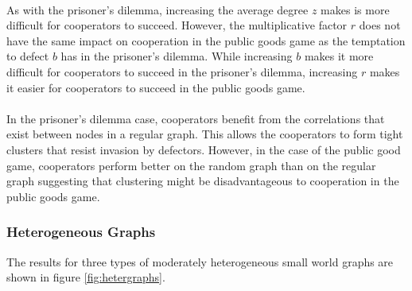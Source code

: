 \documentclass{article}
\begin{document}
	\paragraph{}As with the prisoner's dilemma, increasing the average degree $z$ makes is more difficult for cooperators to succeed.  However, the multiplicative factor $r$ does not have the same impact on cooperation in the public goods game as the temptation to defect $b$ has in the prisoner's dilemma.  While increasing $b$ makes it more difficult for cooperators to succeed in the prisoner's dilemma, increasing $r$ makes it easier for cooperators to succeed in the public goods game.
	\paragraph{}In the prisoner's dilemma case, cooperators benefit from the correlations that exist between nodes in a regular graph.  This allows the cooperators to form tight clusters that resist invasion by defectors.  However, in the case of the public good game, cooperators perform better on the random graph than on the regular graph suggesting that clustering might be disadvantageous to cooperation in the public goods game.

	\subsubsection{Heterogeneous Graphs}
    The results for three types of moderately heterogeneous small world graphs are shown in figure \ref{fig:hetergraphs}.
\end{document}
